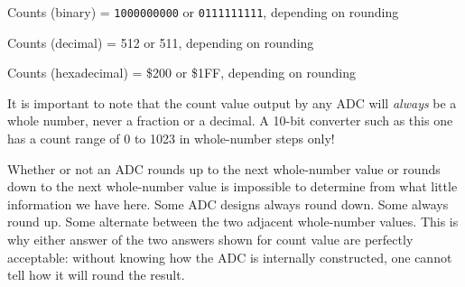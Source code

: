 
Counts (binary) = {\tt 1000000000} or {\tt 0111111111}, depending on rounding

\vskip 10pt

Counts (decimal) = 512 or 511, depending on rounding

\vskip 10pt

Counts (hexadecimal) = \$200 or \$1FF, depending on rounding

\vskip 10pt

It is important to note that the count value output by any ADC will {\it always} be a whole number, never a fraction or a decimal.  A 10-bit converter such as this one has a count range of 0 to 1023 in whole-number steps only!

Whether or not an ADC rounds up to the next whole-number value or rounds down to the next whole-number value is impossible to determine from what little information we have here.  Some ADC designs always round down.  Some always round up.  Some alternate between the two adjacent whole-number values.  This is why either answer of the two answers shown for count value are perfectly acceptable: without knowing how the ADC is internally constructed, one cannot tell how it will round the result.




